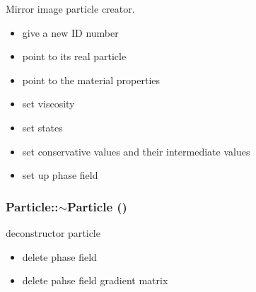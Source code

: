 Mirror image particle creator. 



\begin{itemize}
\item give a new ID number\end{itemize}


\begin{itemize}
\item point to its real particle\end{itemize}


\begin{itemize}
\item point to the material properties\end{itemize}


\begin{itemize}
\item set viscosity\end{itemize}


\begin{itemize}
\item set states\end{itemize}


\begin{itemize}
\item set conservative values and their intermediate values\end{itemize}


\begin{itemize}
\item set up phase field \end{itemize}
\hypertarget{classParticle_d030d0fe7b88cf81744b127c99244ff4}{
\subsubsection[{$\sim$Particle}]{\setlength{\rightskip}{0pt plus 5cm}Particle::$\sim$Particle ()}}
\label{classParticle_d030d0fe7b88cf81744b127c99244ff4}


deconstructor particle 



\begin{itemize}
\item delete phase field\end{itemize}


\begin{itemize}
\item delete pahse field gradient matrix \end{itemize}


